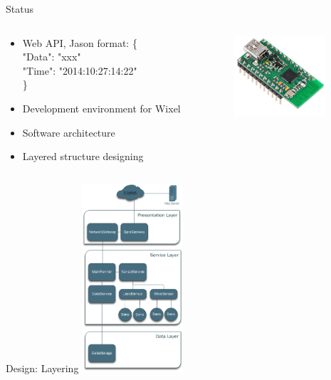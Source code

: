\documentclass{beamer}
\begin{document}
\begin{frame}{Status}
\begin{columns}[T] %
     \begin{column}[T]{6cm} %
		\begin{itemize}
		\item Web API, Jason format:
			\{\\
				"Data": "xxx"\\
				"Time": "2014:10:27:14:22"\\
			\}
		\item Development environment for Wixel
		\item Software architecture
		\item Layered structure designing
		\end{itemize}
	\end{column}
     \begin{column}[T]{4cm} %
          \includegraphics[height=3cm]{graphics/wixel.png}
          \cite{wixel}
     \end{column}
     \end{columns}
\end{frame}

\begin{frame}{Design: Layering}
\centering
\includegraphics[height=7cm]{graphics/Layering.png}
\end{frame}
\end{document}
